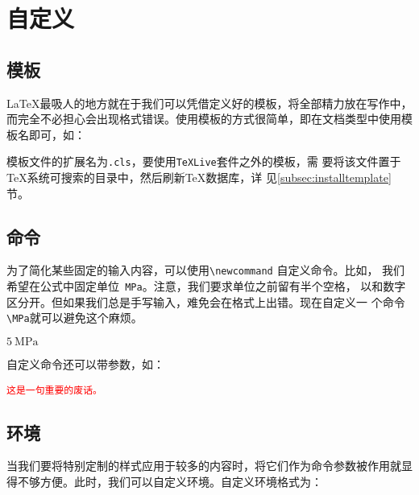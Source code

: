 \section{自定义}

\subsection{模板}

\LaTeX{}最吸人的地方就在于我们可以凭借定义好的模板，将全部精力放在写作中，
而完全不必担心会出现格式错误。使用模板的方式很简单，即在文档类型中使用模
板名即可，如：


模板文件的扩展名为\texttt{.cls}，要使用\texttt{TeXLive}套件之外的模板，需
要将该文件置于\TeX{}系统可搜索的目录中，然后刷新\TeX{}数据库，详
见\ref{subsec:installtemplate}节。

\subsection{命令}

为了简化某些固定的输入内容，可以使用\verb!\newcommand! 自定义命令。比如，
我们希望在公式中固定单位\verb! MPa!。注意，我们要求单位之前留有半个空格，
以和数字区分开。但如果我们总是手写输入，难免会在格式上出错。现在自定义一
个命令\verb!\MPa!就可以避免这个麻烦。

\begin{codeout}
  \newcommand{\MPa}{\ \mathrm{MPa}}
  $5\MPa$
\end{codeout}

自定义命令还可以带参数，如：

\begin{codeout}
  \newcommand{\emphtext}[1]{\textcolor{red}{\texttt{#1}}}
  \emphtext{这是一句重要的废话。}
\end{codeout}

\subsection{环境}

当我们要将特别定制的样式应用于较多的内容时，将它们作为命令参数被作用就显
得不够方便。此时，我们可以自定义环境。自定义环境格式为：

\begin{code}
  \newenvironment{环境名}{环境起始定义}{环境终止定义}
\end{code}

